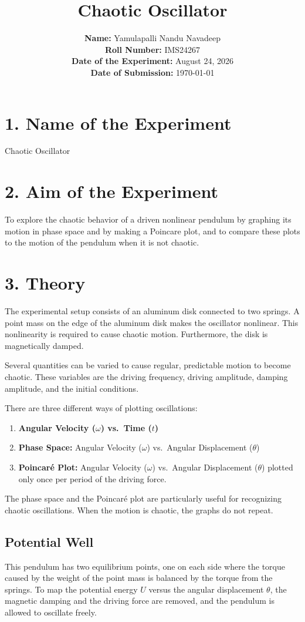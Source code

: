 \documentclass[12pt, a4paper]{article}
\title{\textbf{Chaotic Oscillator}}
\author{
    \textbf{Name:} Yamulapalli Nandu Navadeep \\
    \textbf{Roll Number:} IMS24267 \\
    \textbf{Date of the Experiment:} August 24, 2026 \\
    \textbf{Date of Submission:} \today
}
\date{}
\begin{document}
\maketitle

\section*{1. Name of the Experiment}
Chaotic Oscillator

\section*{2. Aim of the Experiment}
To explore the chaotic behavior of a driven nonlinear pendulum by graphing its motion in phase space and by making a Poincare plot, and to compare these plots to the motion of the pendulum when it is not chaotic. 

\section*{3. Theory}
The experimental setup consists of an aluminum disk connected to two springs. A point mass on the edge of the aluminum disk makes the oscillator nonlinear. This nonlinearity is required to cause chaotic motion. Furthermore, the disk is magnetically damped. 

Several quantities can be varied to cause regular, predictable motion to become chaotic. These variables are the driving frequency, driving amplitude, damping amplitude, and the initial conditions.

There are three different ways of plotting oscillations:
\begin{enumerate}
    \item \textbf{Angular Velocity ($\omega$) vs.\ Time ($t$)}
    \item \textbf{Phase Space:} Angular Velocity ($\omega$) vs.\ Angular Displacement ($\theta$)
    \item \textbf{Poincar\'e Plot:} Angular Velocity ($\omega$) vs.\ Angular Displacement ($\theta$) plotted only once per period of the driving force.
\end{enumerate}
The phase space and the Poincar\'e plot are particularly useful for recognizing chaotic oscillations. When the motion is chaotic, the graphs do not repeat.

\subsection*{Potential Well}
This pendulum has two equilibrium points, one on each side where the torque caused by the weight of the point mass is balanced by the torque from the springs. To map the potential energy $U$ versus the angular displacement $\theta$, the magnetic damping and the driving force are removed, and the pendulum is allowed to oscillate freely. 
\end{document}
